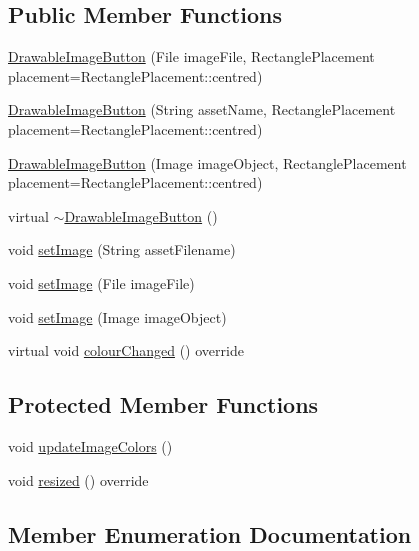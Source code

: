\subsection*{Public Member Functions}
\begin{DoxyCompactItemize}
\item 
\mbox{\hyperlink{classDrawableImageButton_ad27eacc631a480df3acfe72319bd47e2}{Drawable\+Image\+Button}} (File image\+File, Rectangle\+Placement placement=Rectangle\+Placement\+::centred)
\item 
\mbox{\hyperlink{classDrawableImageButton_ae075bdfc11c4054c0bb1d83910f0eb78}{Drawable\+Image\+Button}} (String asset\+Name, Rectangle\+Placement placement=Rectangle\+Placement\+::centred)
\item 
\mbox{\hyperlink{classDrawableImageButton_ad66c8a59c79f217bba34f83d7ed10c5f}{Drawable\+Image\+Button}} (Image image\+Object, Rectangle\+Placement placement=Rectangle\+Placement\+::centred)
\item 
virtual \mbox{\hyperlink{classDrawableImageButton_a77be515a68ea5d2f5dfef780dffd3435}{$\sim$\+Drawable\+Image\+Button}} ()
\item 
void \mbox{\hyperlink{classDrawableImageButton_a556cc57d5e458a935c37798abe19f290}{set\+Image}} (String asset\+Filename)
\item 
void \mbox{\hyperlink{classDrawableImageButton_ad6fd2449bb0d1cd275d44f266d395135}{set\+Image}} (File image\+File)
\item 
void \mbox{\hyperlink{classDrawableImageButton_a726d7b73d84c704d589db73cc89ad53c}{set\+Image}} (Image image\+Object)
\item 
virtual void \mbox{\hyperlink{classDrawableImageButton_ac02e74e19018c10770321ff6066ce24c}{colour\+Changed}} () override
\end{DoxyCompactItemize}
\subsection*{Protected Member Functions}
\begin{DoxyCompactItemize}
\item 
void \mbox{\hyperlink{classDrawableImageButton_a27db37b3b8652d7f3b59bfc887b75ec1}{update\+Image\+Colors}} ()
\item 
void \mbox{\hyperlink{classDrawableImageButton_acdd1318a14a579150f32fe6d22c1e246}{resized}} () override
\end{DoxyCompactItemize}


\subsection{Member Enumeration Documentation}
\mbox{\label{classDrawableImageButton_a98b213074f21a5e58f241cb9910928e0}} 
